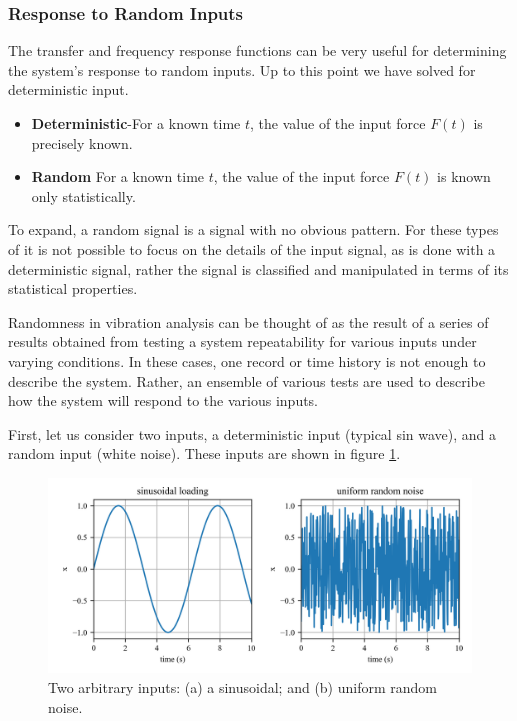\documentclass[12pt,letter]{article}
\numberwithin{ex}{section} %
\numberwithin{re}{section} %
\begin{document}
\subsubsection{Response to Random Inputs}
The transfer and frequency response functions can be very useful for determining the system's response to random inputs. Up to this point we have solved for deterministic input. 

\begin{itemize}
\item \textbf{Deterministic}-For a known time $t$, the value of the input force $F(t)$ is precisely known. 
\item \textbf{Random} For a known time $t$, the value of the input force $F(t)$ is known only statistically. 
\end{itemize}

To expand, a random signal is a signal with no obvious pattern. For these types of it is not possible to focus on the details of the input signal, as is done with a deterministic signal, rather the signal is classified and manipulated in terms of its statistical properties. 

Randomness in vibration analysis can be thought of as the result of a series of results obtained from testing a system repeatability for various inputs under varying conditions. In these cases, one record or time history is not enough to describe the system. Rather, an ensemble of various tests are used to describe how the system will respond to the various inputs. 

First, let us consider two inputs, a deterministic input (typical sin wave), and a random input (white noise). These inputs are shown in figure \ref{fig:Response_to_random_input_inputs}. 

\begin{figure}[H]
	\centering
	\includegraphics[width=1\textwidth]{../Figures/Response_to_random_input_inputs.png}
	\caption{Two arbitrary inputs: (a) a sinusoidal; and (b) uniform random noise.}
	\label{fig:Response_to_random_input_inputs}
\end{figure}
\end{document}
